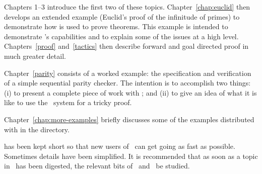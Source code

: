 Chapters 1--3 introduce the first two of these topics.
Chapter~\ref{chap:euclid} then develops an extended example (Euclid's
proof of the infinitude of primes) to demonstrate how \HOL{} is used
to prove theorems.  This example is intended to demonstrate \HOL{}'s
capabilities and to explain some of the issues at a high level.
Chapters~\ref{proof} and~\ref{tactics} then describe forward and goal
directed proof in much greater detail.

Chapter~\ref{parity} consists of a worked example: the specification
and verification of a simple sequential parity checker.  The intention
is to accomplish two things: (i) to present a complete piece of work
with \HOL; and (ii) to give an idea of what it is like to use the
\HOL\ system for a tricky proof.

Chapter~\ref{chap:more-examples} briefly discusses some of the
examples distributed with \holn{} in the  directory.




\vskip 1cm

\noindent \TUTORIAL{} has been kept short so that new users of \HOL\ can get
going as fast as possible. Sometimes details have been simplified. It
is recommended that as soon as a topic in \TUTORIAL\ has been
digested, the relevant bits of \DESCRIPTION\ and \REFERENCE\ be
studied.

